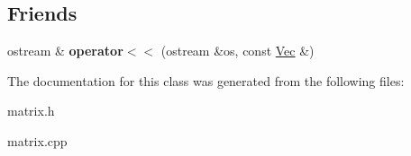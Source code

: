 \subsection*{Friends}
\begin{DoxyCompactItemize}
\item 
ostream \& {\bfseries operator$<$$<$} (ostream \&os, const \hyperlink{classVec}{Vec} \&)\hypertarget{classVec_a2f626ba27f64fc7f61dfe6dcefa5a08e}{}\label{classVec_a2f626ba27f64fc7f61dfe6dcefa5a08e}

\end{DoxyCompactItemize}


The documentation for this class was generated from the following files\+:\begin{DoxyCompactItemize}
\item 
matrix.\+h\item 
matrix.\+cpp\end{DoxyCompactItemize}
